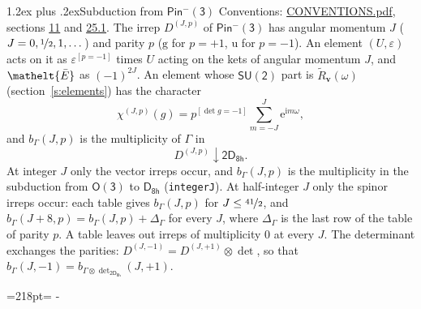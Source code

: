 \documentclass[10pt,a4paper]{article}
\makeatletter
\renewcommand\section{\@startsection{section}{1}{\z@}{-3ex plus -1ex minus -.2ex}%
  {1.2ex plus .2ex}{\normalfont\large\sffamily\bfseries\color{parttitle}}}
\newcommand{\needspace}[1]{\par\penalty-100\begingroup\dimen0=#1\relax\dimen2=\pagegoal
  \advance\dimen2-\pagetotal\ifdim\dimen0>\dimen2\relax\ifdim\dimen2>0pt\vfil\break\fi\fi
  \endgroup}
\numberwithin{equation}{section}
\newcommand{\eltfont}[1]{{\let\sigma\eltsigma\mathelt{#1}}}
\newcommand{\grp}[1]{\mathsf{#1}}
\newcommand{\elt}[1]{\eltfont{#1}}
\newcommand{\ptag}[1]{\mathrm{#1}}
\newcommand{\iverson}[1]{[#1]}
\newcommand{\restr}[2]{#1\!\downarrow#2}
\newcommand{\vv}{\mathbf{v}}
\newcommand{\iunit}{\mathrm{i}}
\newcommand{\expe}{\mathrm{e}}
\newcommand{\irrJp}[2]{D^{(#1,#2)}}
\newcommand{\irrprod}{\otimes}
\newcommand{\barred}[1]{\bar{#1}}
\newcommand{\lift}[1]{\tilde{#1}}
\makeatother
\begin{document}
\section{Subduction from \texorpdfstring{$\grp{Pin^{-}(3)}$}{Pin(3)}}\label{s:subduction_parent}
Conventions: \href{../../CONVENTIONS.pdf}{CONVENTIONS.pdf}, sections \href{../../../rotation/CONVENTIONS.pdf\#conv.11}{11} and \href{../../CONVENTIONS.pdf\#conv.25.1}{25.1}.
\leavevmode\label{n:index.J}\label{n:index.parity}\label{n:irrep.o3}The irrep $\irrJp{J}{p}$ of \href{Pinminus3.pdf}{$\grp{Pin^{-}(3)}$} has angular momentum $J$ ($J = 0, \nicefrac{1}{2}, 1, \dots$) and parity $p$ ($\ptag{g}$ for $p = +1$, $\ptag{u}$ for $p = -1$). An element $(U, \varepsilon)$ acts on it as $\varepsilon^{[p = -1]}$ times $U$ acting on the kets of angular momentum $J$, and $\elt{\barred{E}}$ as $(-1)^{2J}$. \label{n:function.character.parent}\label{n:function.multiplicity}An element whose $\grp{SU(2)}$ part is $\lift{R}_{\vv}(\omega)$ (section~\ref{s:elements}) has the character
\begin{equation}\label{e:chi}\chi^{(J,p)}(g) = p^{\iverson{\det g = -1}}\sum_{m=-J}^{J} \expe^{\iunit m\omega},\end{equation}
and $b_\Gamma(J, p)$ is the multiplicity of $\Gamma$ in
\begin{equation}\label{e:parent}\restr{\irrJp{J}{p}}{\grp{2D_{8h}}}.\end{equation}
At integer $J$ only the vector irreps occur, and $b_\Gamma(J, p)$ is the multiplicity in the subduction from $\grp{O(3)}$ to \href{../../../rotation/data/pdf/D8h.pdf}{$\grp{D_{8h}}$} (\texttt{integerJ}). \label{n:index.increment}At half-integer $J$ only the spinor irreps occur: each table gives $b_\Gamma(J, p)$ for $J \le \nicefrac{41}{2}$, and $b_\Gamma(J + 8, p) = b_\Gamma(J, p) + \Delta_\Gamma$ for every $J$, where $\Delta_\Gamma$ is the last row of the table of parity $p$. A table leaves out irreps of multiplicity 0 at every $J$.
\leavevmode\label{n:operator.determinant.character}The determinant exchanges the parities: $\irrJp{J}{-1} = \irrJp{J}{+1} \irrprod \det$, so that $b_\Gamma(J, -1) = b_{\Gamma \irrprod \det_{\grp{2D_{8h}}}}(J, +1)$.
\needspace{218pt}
\end{document}
